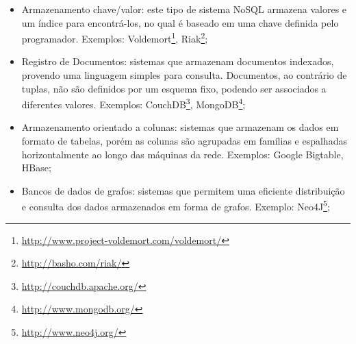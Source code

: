 \begin{itemize}

  \item{Armazenamento chave/valor: este tipo de sistema NoSQL armazena valores e um índice para encontrá-los, no qual é baseado em uma chave definida pelo programador. Exemplos: Voldemort\footnote{\url{http://www.project-voldemort.com/voldemort/}}, Riak\footnote{\url{http://basho.com/riak/}};}
  \item{Registro de Documentos: sistemas que armazenam documentos indexados, provendo uma linguagem simples para consulta. Documentos, ao contrário de tuplas, não são definidos por um esquema fixo, podendo ser associados a diferentes valores. Exemplos: CouchDB\footnote{\url{http://couchdb.apache.org/}}, MongoDB\footnote{\url{http://www.mongodb.org/}};}
  \item{Armazenamento orientado a colunas: sistemas que armazenam os dados em formato de tabelas, porém as colunas são agrupadas em famílias e espalhadas horizontalmente ao longo das máquinas da rede. Exemplos: Google Bigtable, HBase;}
  \item{Bancos de dados de grafos: sistemas que permitem uma eficiente distribuição e consulta dos dados armazenados em forma de grafos. Exemplo: Neo4J\footnote{\url{http://www.neo4j.org/}};}

\end{itemize}



